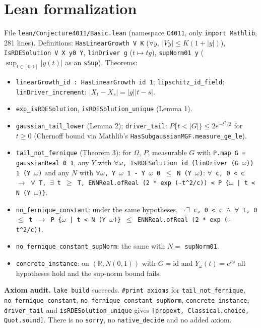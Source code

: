 \documentclass[11pt]{article}
\theoremstyle{remark}
\begin{document}
\section{Lean formalization}

File \texttt{lean/Conjecture4011/Basic.lean} (namespace \texttt{C4011}, only
\texttt{import Mathlib}, 281 lines). Definitions: \texttt{HasLinearGrowth V K}
($\forall y,\ |V y| \le K(1+|y|)$), \texttt{IsRDESolution V X y0 Y}, \texttt{linDriver g}
($t \mapsto t g$), \texttt{supNorm01 y} ($\sup_{t\in[0,1]}|y(t)|$ as an \texttt{sSup}). Theorems:
\begin{itemize}
\item \texttt{linearGrowth\_id : HasLinearGrowth id 1}; \texttt{lipschitz\_id\_field};
\texttt{linDriver\_increment}: $|X_t - X_s| = |g||t-s|$.
\item \texttt{exp\_isRDESolution}, \texttt{isRDESolution\_unique} (Lemma 1).
\item \texttt{gaussian\_tail\_lower} (Lemma 2); \texttt{driver\_tail}:
$P\{t < |G|\} \le 2e^{-t^2/2}$ for $t \ge 0$ (Chernoff bound via Mathlib's
\texttt{HasSubgaussianMGF.measure\_ge\_le}).
\item \texttt{tail\_not\_fernique} (Theorem 3): for $\Omega$, $P$, measurable $G$ with
\texttt{P.map G = gaussianReal 0 1}, any $Y$ with
\texttt{$\forall\omega$, IsRDESolution id (linDriver (G $\omega$)) 1 (Y $\omega$)} and any $N$ with
\texttt{$\forall\omega$, Y $\omega$ 1 - Y $\omega$ 0 $\le$ N (Y $\omega$)}:
\texttt{$\forall$ c, 0 < c $\to$ $\forall$ T, $\exists$ t $\ge$ T, ENNReal.ofReal (2 * exp (-t\^{}2/c)) < P \{$\omega$ | t < N (Y $\omega$)\}}.
\item \texttt{no\_fernique\_constant}: under the same hypotheses,
\texttt{$\neg\,\exists$ c, 0 < c $\wedge$ $\forall$ t, 0 $\le$ t $\to$ P \{$\omega$ | t < N (Y $\omega$)\} $\le$ ENNReal.ofReal (2 * exp (-t\^{}2/c))}.
\item \texttt{no\_fernique\_constant\_supNorm}: the same with $N = $ \texttt{supNorm01}.
\item \texttt{concrete\_instance}: on $(\mathbb{R}, N(0,1))$ with $G = \mathrm{id}$ and
$Y_\omega(t) = e^{t\omega}$ all hypotheses hold and the sup-norm bound fails.
\end{itemize}
\textbf{Axiom audit.} \texttt{lake build} succeeds. \texttt{\#print axioms} for
\texttt{tail\_not\_fernique}, \texttt{no\_fernique\_constant}, \texttt{no\_fernique\_constant\_supNorm},
\texttt{concrete\_instance}, \texttt{driver\_tail} and \texttt{isRDESolution\_unique} gives
\texttt{[propext, Classical.choice, Quot.sound]}. There is no \texttt{sorry}, no
\texttt{native\_decide} and no added axiom.
\end{document}
